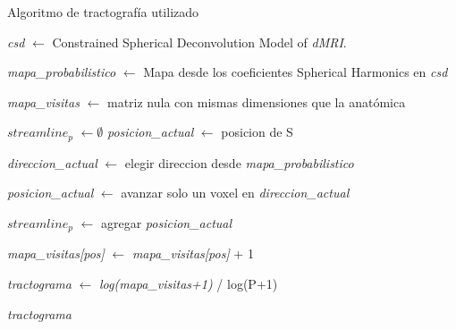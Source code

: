 \begin{algorithm}[h!]
\caption{Algoritmo de tractograf\'ia utilizado}\label{alg:localtracking}
\begin{algorithmic}[1]


\State \emph{csd} $\gets$ Constrained Spherical Deconvolution Model of \emph{dMRI}. 

\State \emph{mapa\_probabilistico} $\gets$ Mapa desde los coeficientes
                                           Spherical Harmonics en \emph{csd}

\State \emph{mapa\_visitas} $\gets$ matriz nula con mismas dimensiones que la anat\'omica


    \State $streamline_p$ $\gets \emptyset$
    \State \emph{posicion\_actual} $\gets$ posicion de S
    

        \State \emph{direccion\_actual} $\gets$ elegir direccion desde
                                               \emph{mapa\_probabilistico} 
        
        \State \emph{posicion\_actual} $\gets$ avanzar solo un voxel en
                                               \emph{direccion\_actual} 
        
        \State $streamline_p$ $\gets$ agregar \emph{posicion\_actual}    
        
    \EndWhile
    
        \State \emph{mapa\_visitas[pos]} $\gets$ \emph{mapa\_visitas[pos]} + 1
    \EndFor
    
\EndFor

\State \emph{tractograma} $\gets$
                                 \emph{log(mapa\_visitas+1)} / log(P+1)    

\State \Return \emph{tractograma} 
 
\EndProcedure

\end{algorithmic}
\label{alg:itract}
\end{algorithm}

